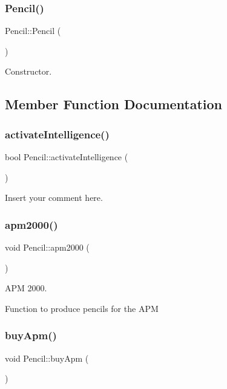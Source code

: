 \subsubsection{\texorpdfstring{Pencil()}{Pencil()}}
{\footnotesize\ttfamily Pencil\+::\+Pencil (\begin{DoxyParamCaption}{ }\end{DoxyParamCaption})}

Constructor. 

\subsection{Member Function Documentation}
\mbox{\label{classPencil_a9288c33b601a667ebd40ba121c8bed36}} 
\subsubsection{\texorpdfstring{activate\+Intelligence()}{activateIntelligence()}}
{\footnotesize\ttfamily bool Pencil\+::activate\+Intelligence (\begin{DoxyParamCaption}{ }\end{DoxyParamCaption})}

Insert your comment here. \mbox{\label{classPencil_ad1f8942401865e05d2a220f64a309f3e}} 
\subsubsection{\texorpdfstring{apm2000()}{apm2000()}}
{\footnotesize\ttfamily void Pencil\+::apm2000 (\begin{DoxyParamCaption}{ }\end{DoxyParamCaption})}

A\+PM 2000.

Function to produce pencils for the A\+PM \mbox{\label{classPencil_a506c7c9587a026f1238e880b1b103c2f}} 
\subsubsection{\texorpdfstring{buy\+Apm()}{buyApm()}}
{\footnotesize\ttfamily void Pencil\+::buy\+Apm (\begin{DoxyParamCaption}{ }\end{DoxyParamCaption})}

